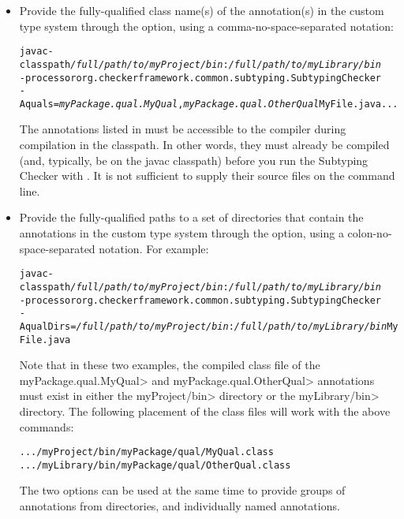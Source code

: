\begin{itemize}

\item
Provide the fully-qualified class name(s) of the annotation(s) in the custom
type system through the  option, using a comma-no-space-separated
notation:

\begin{alltt}
  javac -classpath \textit{/full/path/to/myProject/bin}:\textit{/full/path/to/myLibrary/bin} \ttbs
        -processor org.checkerframework.common.subtyping.SubtypingChecker \ttbs
        -Aquals=\textit{myPackage.qual.MyQual},\textit{myPackage.qual.OtherQual} MyFile.java ...
\end{alltt}

The annotations listed in  must be accessible to
the compiler during compilation in the classpath.  In other words, they must
already be compiled (and, typically, be on the javac classpath)
before you run the Subtyping Checker with .  It
is not sufficient to supply their source files on the command line.

\item
Provide the fully-qualified paths to a set of directories that contain the
annotations in the custom type system through the  option,
using a colon-no-space-separated notation. For example:

\begin{alltt}
  javac -classpath \textit{/full/path/to/myProject/bin}:\textit{/full/path/to/myLibrary/bin} \ttbs
        -processor org.checkerframework.common.subtyping.SubtypingChecker \ttbs
        -AqualDirs=\textit{/full/path/to/myProject/bin}:\textit{/full/path/to/myLibrary/bin} MyFile.java
\end{alltt}

Note that in these two examples, the compiled class file of the
\<myPackage.qual.MyQual> and \<myPackage.qual.OtherQual> annotations must exist
in either the \<myProject/bin> directory or the \<myLibrary/bin> directory. The
following placement of the class files will work with the above commands:

\begin{alltt}
  .../myProject/bin/myPackage/qual/MyQual.class
  .../myLibrary/bin/myPackage/qual/OtherQual.class
\end{alltt}

The two options can be used at the same time to provide groups of annotations
from directories, and individually named annotations.

\end{itemize}

